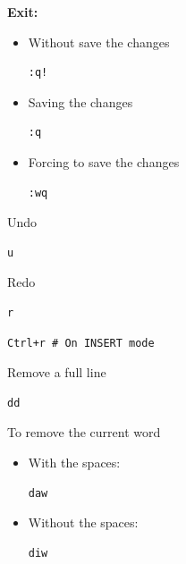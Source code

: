 \documentclass{article}
\newenvironment{codetemplate}[1][]{%
  \mybasecolorbox[#1]
  \itshape
}{%
  \endmybasecolorbox
}
\begin{document}
\textbf{Exit:}

\begin{itemize}
    \item Without save the changes
\begin{codetemplate}{}
\begin{verbatim}
:q!
\end{verbatim}
\end{codetemplate}
    \item Saving the changes
\begin{codetemplate}{}
\begin{verbatim}
:q
\end{verbatim}
\end{codetemplate}

    \item Forcing to save the changes
\begin{codetemplate}{}
\begin{verbatim}
:wq
\end{verbatim}
\end{codetemplate}
\end{itemize}


Undo
\begin{codetemplate}{}
\begin{verbatim}
u
\end{verbatim}
\end{codetemplate}

Redo
\begin{codetemplate}{}
\begin{verbatim}
r
\end{verbatim}
\end{codetemplate}
\begin{codetemplate}{}
\begin{verbatim}
Ctrl+r # On INSERT mode
\end{verbatim}
\end{codetemplate}

Remove a full line
\begin{codetemplate}{}
\begin{verbatim}
dd
\end{verbatim}
\end{codetemplate}

To remove the current word
\begin{itemize}
    \item With the spaces:
\begin{codetemplate}
\begin{verbatim}
daw
\end{verbatim}
\end{codetemplate}
    \item Without the spaces:
\begin{codetemplate}
\begin{verbatim}
diw
\end{verbatim}
\end{codetemplate}
\end{itemize}
\end{document}
